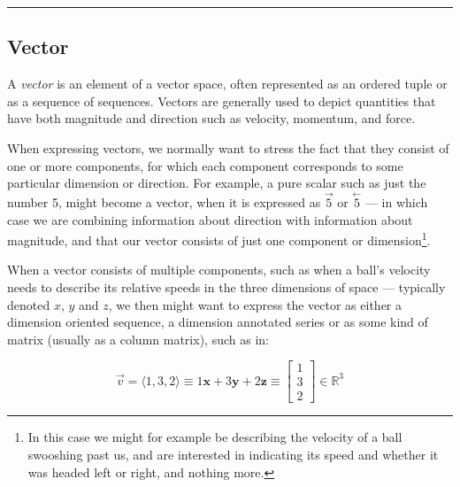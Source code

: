 \documentclass[a4paper, 18pt]{book} %
\begin{document}
\begin{appendices}
\noindent\rule{\textwidth}{0.4pt}


\subsection*{Vector}

A \emph{vector} is an element of a vector space, often represented as an ordered tuple or as a sequence of sequences. Vectors are generally used to depict quantities that have both magnitude and direction\cite{axler2015linear}\cite{ronlarsoncalculus} such as velocity, momentum, and force.

\vspace{2em}

When expressing vectors, we normally want to stress the fact that they consist of one or more components, for which each component corresponds to some particular dimension or direction. For example, a pure scalar such as just the number 5, might become a vector, when it is expressed as $\overset{\rightarrow}{5}$ or $\overset{\leftarrow}{5}$ --- in which case we are combining information about direction with information about magnitude, and that our vector consists of just one component or dimension\footnote{In this case we might for example be describing the velocity of a ball swooshing past us, and are interested in indicating its speed and whether it was headed left or right, and nothing more.}.

\vspace{2em}

When a vector consists of multiple components, such as when a ball's velocity needs to describe its relative speeds in the three dimensions of space --- typically denoted $x$, $y$ and $z$, we then might want to express the vector as either a dimension oriented sequence, a dimension annotated series or as some kind of matrix (usually as a column matrix), such as in:

\vspace{2em}

\begin{equation}
\label{EQVECT}
\vec{v} = \langle 1, 3, 2 \rangle \equiv 1\textbf{x} + 3\textbf{y} + 2\textbf{z} \equiv  \begin{bmatrix} 1 \\ 3 \\ 2 \end{bmatrix} \in \mathbb{R}^3
\end{equation}


\vspace{2em}


\end{appendices}
\end{document}
